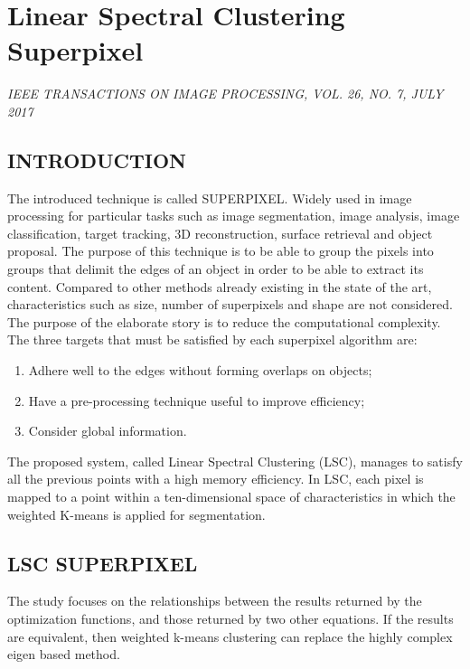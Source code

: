 \section{Linear Spectral Clustering Superpixel}

\begin{flushleft}
    \author{
    Jiansheng Chen, 
    \emph{Member, IEEE}, 
    Zhengqin Li,
    \emph{Student Member, IEEE}, 
    Bo Huang 
}
\end{flushleft}

\begin{center}
    \emph{IEEE TRANSACTIONS ON IMAGE PROCESSING, VOL. 26, NO. 7, JULY 2017}
\end{center}

\subsection{INTRODUCTION}
The introduced technique is called SUPERPIXEL. Widely used in image 
processing for particular tasks such as image segmentation, image analysis, 
image classification, target tracking, 3D reconstruction, surface retrieval and 
object proposal. The purpose of this technique is to be able to group the 
pixels into groups that delimit the edges of an object in order to be able 
to extract its content. Compared to other methods already existing in the 
state of the art, characteristics such as size, number of superpixels and shape 
are not considered. The purpose of the elaborate story is to reduce the 
computational complexity. The three targets that must be satisfied by each 
superpixel algorithm are:
\begin{enumerate}
    \item Adhere well to the edges without forming overlaps on objects;
    \item Have a pre-processing technique useful to improve efficiency;
    \item Consider global information.
\end{enumerate}
The proposed system, called Linear Spectral Clustering (LSC), manages to 
satisfy all the previous points with a high memory efficiency. In LSC, each 
pixel is mapped to a point within a ten-dimensional space of characteristics 
in which the weighted K-means is applied for segmentation. 

\subsection{LSC SUPERPIXEL}
The study focuses on the relationships between the results returned by the 
optimization functions, and those returned by two other equations. If the results 
are equivalent, then weighted k-means clustering can replace the highly 
complex eigen based method.

